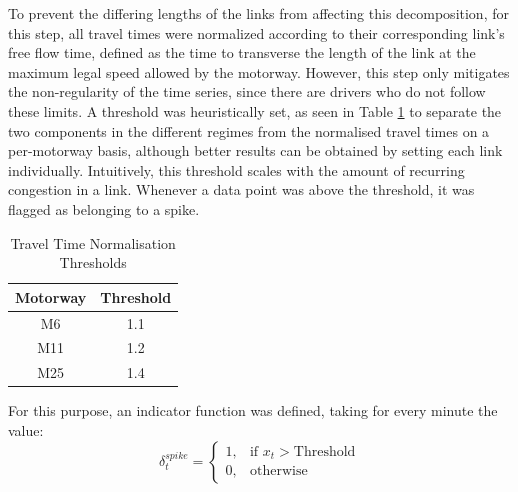 \documentclass[letterpaper, 10 pt, conference]{ieeeconf}  %
\begin{document}
To prevent the differing lengths of the links from affecting this decomposition, for this step, all travel times were normalized according to their corresponding link's free flow time, defined as the time to transverse the length of the link at the maximum legal speed allowed by the motorway. 
However, this step only mitigates the non-regularity of the time series, since there are drivers who do not follow these limits.
A threshold was heuristically set, as seen in Table \ref{table:threshold}  to separate the two components in the different regimes from the normalised travel times on a per-motorway basis, although better results can be obtained by setting each link individually. 
Intuitively, this threshold scales with the amount of recurring congestion in a link. Whenever a data point was above the threshold, it was flagged as belonging to a spike.
\begin{table}[htbp]
	\caption{Travel Time Normalisation Thresholds}
	\begin{center}
		\begin{tabular}{|c|c|}
			\hline
			\textbf{Motorway}&{\textbf{Threshold}} \\
			\hline
			M6& 1.1\\
			\hline
			M11& 1.2\\
			\hline
			M25& 1.4\\
			\hline
		\end{tabular}
		\label{table:threshold}
	\end{center}
\end{table}



For this purpose, an indicator function was defined, taking for every minute the value:
\begin{equation}
    \delta_t^{spike}=
    \begin{cases}
      1, & \text{if } x_t > \text{Threshold}\\
      0, & \text{otherwise}
    \end{cases}
    \label{delta}
  \end{equation}
\end{document}
